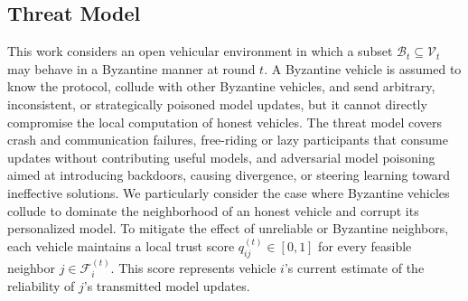 
\subsection{Threat Model}

This work considers an open vehicular environment in which a subset $\mathcal{B}_t\subseteq\mathcal{V}_t$ may behave in a Byzantine manner at round $t$. A Byzantine vehicle is assumed to know the protocol, collude with other Byzantine vehicles, and send arbitrary, inconsistent, or strategically poisoned model updates, but it cannot directly compromise the local computation of honest vehicles. The threat model covers crash and communication failures, free-riding or lazy participants that consume updates without contributing useful models, and adversarial model poisoning aimed at introducing backdoors, causing divergence, or steering learning toward ineffective solutions. We particularly consider the case where Byzantine vehicles collude to dominate the neighborhood of an honest vehicle and corrupt its personalized model. To mitigate the effect of unreliable or Byzantine neighbors, each vehicle maintains a local trust score $q_{ij}^{(t)}\in[0,1]$ for every feasible neighbor $j\in\mathcal{F}_i^{(t)}$. This score represents vehicle $i$'s current estimate of the reliability of $j$'s transmitted model updates.


